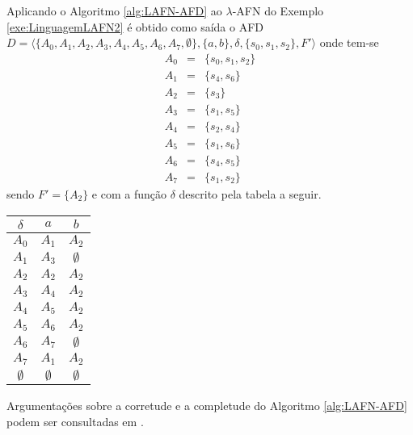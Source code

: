 \begin{example}
	Aplicando o Algoritmo \ref{alg:LAFN-AFD} ao $\lambda$-AFN do Exemplo \ref{exe:LinguagemLAFN2} é obtido como saída o AFD $D = \langle \{A_0, A_1, A_2, A_3, A_4, A_5, A_6, A_7, \emptyset\}, \{a,b\}, \delta, \{s_0, s_1, s_2\}, F' \rangle$ onde tem-se 
	\begin{eqnarray*}
		A_0 & = &  \{s_0, s_1, s_2\}\\
		A_1 & = & \{s_4, s_6\}\\
		A_2 & = & \{s_3\}\\
		A_3 & = & \{s_1, s_5\}\\
		A_4 & = & \{s_2, s_4\}\\
		A_5 & = & \{s_1, s_6\}\\
		A_6 & = & \{s_4, s_5\}\\
		A_7  & = & \{s_1, s_2\}
	\end{eqnarray*}
	sendo $F' = \{A_2\}$ e com a função  $\delta$ descrito pela tabela a seguir. 
	
	\begin{table*}[h]
		\centering
		\begin{tabular}{c|cc}
			$\delta$	& $a$ & $b$\\ \hline
			$A_0$		& $A_1$ & $A_2$ \\
			$A_1$		& $A_3$ & $\emptyset$ \\
			$A_2$		& $A_2$ & $A_2$ \\
			$A_3$		& $A_4$ & $A_2$ \\
			$A_4$		& $A_5$ & $A_2$ \\
			$A_5$		& $A_6$ & $A_2$ \\
			$A_6$		& $A_7$ & $\emptyset$ \\ 
			$A_7$		& $A_1$ & $A_2$ \\ 
			$\emptyset$		& $\emptyset$ & $\emptyset$ \\ \hline
		\end{tabular}
	\end{table*}
\end{example}

\begin{remark}
	Argumentações sobre a corretude e a completude do Algoritmo \ref{alg:LAFN-AFD} podem ser consultadas em \cite{hopcroft2008}.
\end{remark}


